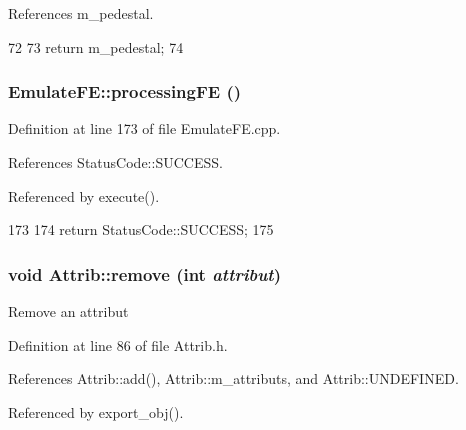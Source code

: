 References m\_\-pedestal.


\begin{DoxyCode}
72                   {
73     return m_pedestal;
74   }
\end{DoxyCode}
\hypertarget{classEmulateFE_adf7213a308c8a04f4d7efbb86a13689e}{
\subsubsection[{processingFE}]{ EmulateFE::processingFE ()}}
\label{classEmulateFE_adf7213a308c8a04f4d7efbb86a13689e}


Definition at line 173 of file EmulateFE.cpp.

References StatusCode::SUCCESS.

Referenced by execute().


\begin{DoxyCode}
173                                     {
174   return StatusCode::SUCCESS;
175 }
\end{DoxyCode}
\hypertarget{classAttrib_a7d4ef7e32d93cb287792b87b857e79f3}{
\subsubsection[{remove}]{\setlength{\rightskip}{0pt plus 5cm}void Attrib::remove (int {\em attribut})}}
\label{classAttrib_a7d4ef7e32d93cb287792b87b857e79f3}
Remove an attribut 

Definition at line 86 of file Attrib.h.

References Attrib::add(), Attrib::m\_\-attributs, and Attrib::UNDEFINED.

Referenced by export\_\-obj().


